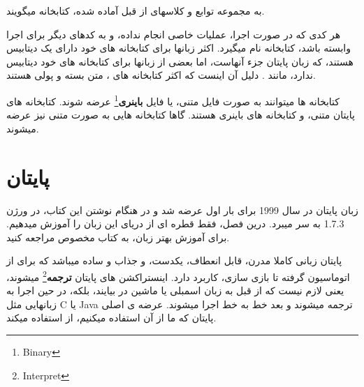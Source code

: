 \documentclass[14pt,a4paper]{memoir}
\begin{document}
	 به مجموعه توابع و کلاسهای از قبل آماده شده، کتابخانه میگویند.
	 
	 هر کدی که در صورت اجرا، عملیات خاصی انجام نداده، و به کدهای دیگر برای اجرا وابسته باشد، کتابخانه نام میگیرد.
	 اکثر زبانها برای کتابخانه های خود دارای یک دیتابیس هستند، که زبان پایتان جزء آنهاست، اما بعضی از زبانها برای کتابخانه های خود دیتابیس ندارد، مانند . دلیل آن اینست که اکثر کتابخانه های ، متن بسته و پولی هستند.
	 
	 کتابخانه ها میتوانند به صورت فایل متنی، یا فایل \textbf{باینری}\footnote{Binary} عرضه شوند. کتابخانه های پایتان متنی، و کتابخانه های  باینری هستند. گاها کتابخانه هایی به صورت متنی نیز عرضه میشوند.
	 
	 
	 \section{پایتان}\label{py}
	 
	 زبان پایتان در سال 1999 برای بار اول عرضه شد و در هنگام نوشتن این کتاب، در ورژن 1.7.3 به سر میبرد. درین فصل، فقط قطره ای از دریای این زبان را آموزش میدهیم. برای آموزش بهتر زبان، به کتاب مخصوص مراجعه کنید.
	 
	 پایتان زبانی کاملا مدرن، قابل انعطاف، یکدست، و جذاب و ساده میباشد که برای از اتوماسیون گرفته تا بازی سازی، کاربرد دارد. 
	 اینستراکشن های پایتان \textbf{ترجمه}\footnote{Interpret} میشوند، یعنی لازم نیست که از قبل به زبان اسمبلی یا ماشین در بیایند، بلکه، در حین اجرا به زبانهایی مثل C یا Java ترجمه میشوند و بعد خط به خط اجرا میشوند. عرضه ی اصلی پایتان که ما از آن استفاده میکنیم، از  استفاده میکند.
	 
\end{document}
